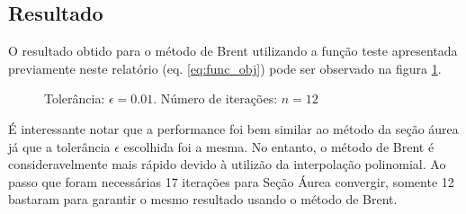 \subsection{Resultado}

O resultado obtido para o método de Brent utilizando a função teste apresentada previamente neste relatório (eq. \ref{eq:func_obj}) pode ser observado na figura \ref{fig:brent}.\\

\begin{figure}[h!]
\centering
\scalebox{1}{}
\caption{Tolerância: $\epsilon =  0.01$. Número de iterações: $n = 12$}
\label{fig:brent}
\end{figure}

É interessante notar que a performance foi bem similar ao método da seção áurea já que a tolerância $\epsilon$ escolhida foi a mesma. No entanto, o método de Brent é consideravelmente mais rápido devido à utilizão da interpolação polinomial. Ao passo que foram necessárias 17 iterações para Seção Áurea convergir, somente 12 bastaram para garantir o mesmo resultado usando o método de Brent.